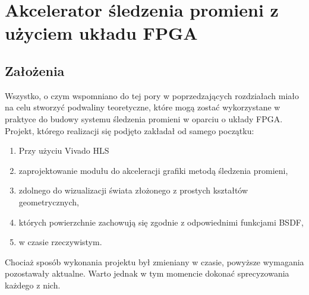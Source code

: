 \chapter{Akcelerator śledzenia promieni z użyciem układu FPGA}
\section{Założenia}
Wszystko, o czym wspomniano do tej pory w poprzedzających rozdziałach miało na celu stworzyć podwaliny teoretyczne, które mogą zostać wykorzystane w praktyce do budowy systemu śledzenia promieni w oparciu o układy FPGA. Projekt, którego realizacji się podjęto zakładał od samego początku:
\begin{enumerate}
\item Przy użyciu Vivado HLS
\item zaprojektowanie modułu do akceleracji grafiki metodą śledzenia promieni,
\item zdolnego do wizualizacji świata złożonego z prostych kształtów geometrycznych,
\item których powierzchnie zachowują się zgodnie z odpowiednimi funkcjami BSDF,
\item w czasie rzeczywistym.
\end{enumerate}

Chociaż sposób wykonania projektu był zmieniany w czasie, powyższe wymagania pozostawały aktualne. Warto jednak w tym momencie dokonać sprecyzowania każdego z nich.

